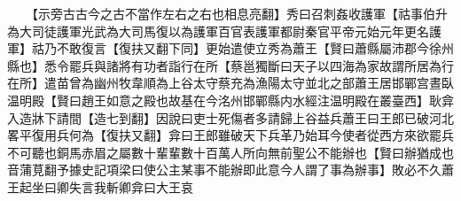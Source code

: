 　　【示旁古古今之古不當作左右之右也相息亮翻】秀曰召刺姦收護軍【祜事伯升為大司徒護軍光武為大司馬復以為護軍百官表護軍都尉秦官平帝元始元年更名護軍】祜乃不敢復言【復扶又翻下同】更始遣使立秀為蕭王【賢曰蕭縣屬沛郡今徐州縣也】悉令罷兵與諸將有功者詣行在所【蔡邕獨斷曰天子以四海為家故謂所居為行在所】遣苗曾為幽州牧韋順為上谷太守蔡充為漁陽太守並北之部蕭王居邯鄲宫晝臥温明殿【賢曰趙王如意之殿也故基在今洺州邯鄲縣内水經注温明殿在叢臺西】耿弇入造牀下請間【造七到翻】因說曰吏士死傷者多請歸上谷益兵蕭王曰王郎已破河北畧平復用兵何為【復扶又翻】弇曰王郎雖破天下兵革乃始耳今使者從西方來欲罷兵不可聽也銅馬赤眉之屬數十輩輩數十百萬人所向無前聖公不能辦也【賢曰辦猶成也音蒲莧翻予據史記項梁曰使公主某事不能辦即此意今人謂了事為辦事】敗必不久蕭王起坐曰卿失言我斬卿弇曰大王哀
